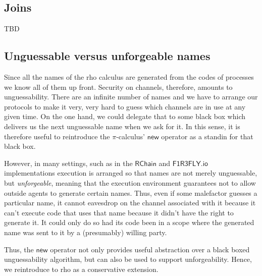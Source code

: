 \subsection{Joins}
TBD
\subsection{Unguessable versus unforgeable names}
Since all the names of the rho calculus are generated from the codes
of processes we know all of them up front. Security on channels,
therefore, amounts to unguessability. There are an infinite number of
names and we have to arrange our protocols to make it very, very hard
to guess which channels are in use at any given time. On the one hand,
we could delegate that to some black box which delivers us the next
unguessable name when we ask for it. In this sense, it is therefore
useful to reintroduce the $\pi$-calculus' $\mathsf{new}$ operator as a
standin for that black box.

However, in many settings, such as in the $\mathsf{RChain}$ and
$\mathsf{F1R3FLY.io}$ implementations execution is arranged so that
names are not merely unguessable, but \emph{unforgeable}, meaning that
the execution environment guarantees not to allow outside agents to
generate certain names. Thus, even if some malefactor guesses a
particular name, it cannot eavesdrop on the channel associated with it
because it can't execute code that uses that name because it didn't
have the right to generate it. It could only do so had its code been
in a scope where the generated name was sent to it by a (presumably)
willing party.

Thus, the $\mathsf{new}$ operator not only provides useful abstraction
over a black boxed unguessability algorithm, but can also be used to
support unforgeability. Hence, we reintroduce to rho as a conservative
extension.

